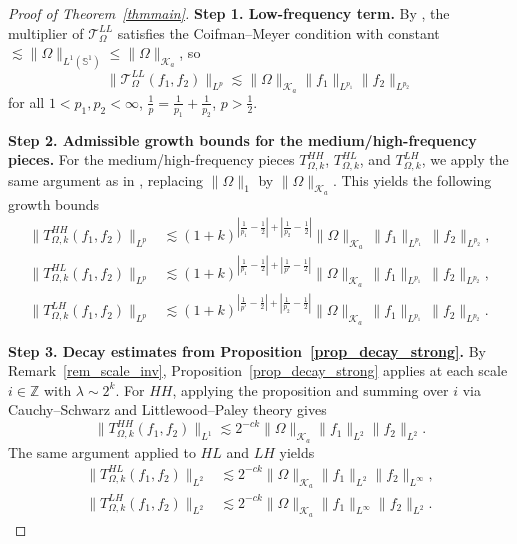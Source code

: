 \documentclass[11pt]{amsart}
\begin{document}
\begin{proof}[Proof of Theorem~\ref{thmmain}]
	
	\medskip
	\noindent
	
\noindent\textbf{Step 1. Low-frequency term.}
	By \cite[Lemma~5.1 and Theorem~5.2]{bhojak2025alternate}, the multiplier 
	of $\mathcal{T}_\Omega^{LL}$ satisfies the Coifman--Meyer condition with 
	constant $\lesssim\|\Omega\|_{L^1(\mathbb S^1)}\le\|\Omega\|_{\mathcal K_a}$, 
	so
	\[
	\|\mathcal{T}_\Omega^{LL}(f_1,f_2)\|_{L^p}
	\lesssim
	\|\Omega\|_{\mathcal K_a}\|f_1\|_{L^{p_1}}\|f_2\|_{L^{p_2}}
	\]
	for all $1<p_1,p_2<\infty$, $\frac1p=\frac1{p_1}+\frac1{p_2}$, $p>\frac12$.
	
	\medskip
	\noindent
	\textbf{Step 2. Admissible growth bounds for the medium/high-frequency pieces.}  
	For the medium/high-frequency pieces \(T_{\Omega,k}^{HH}\), \(T_{\Omega,k}^{HL}\), and \(T_{\Omega,k}^{LH}\), we apply the same argument as in \cite[Lemma~5.3]{bhojak2025alternate}, replacing \(\|\Omega\|_1\) by \(\|\Omega\|_{\mathcal K_a}\). This yields the following growth bounds
	\begin{align}
		\|T_{\Omega,k}^{HH}(f_1,f_2)\|_{L^p}
		&\lesssim
		(1+k)^{\left|\frac1{p_1}-\frac12\right|+\left|\frac1{p_2}-\frac12\right|}
		\|\Omega\|_{\mathcal K_a}\,
		\|f_1\|_{L^{p_1}}\,
		\|f_2\|_{L^{p_2}},\label{eqHH-growth}\\
		\|T_{\Omega,k}^{HL}(f_1,f_2)\|_{L^p}
		&\lesssim
		(1+k)^{\left|\frac1{p_1}-\frac12\right|+\left|\frac1{p'}-\frac12\right|}
		\|\Omega\|_{\mathcal K_a}\,
		\|f_1\|_{L^{p_1}}\,
		\|f_2\|_{L^{p_2}},\label{eqHL-growth}\\
		\|T_{\Omega,k}^{LH}(f_1,f_2)\|_{L^p}
		&\lesssim
		(1+k)^{\left|\frac1{p'}-\frac12\right|+\left|\frac1{p_2}-\frac12\right|}
		\|\Omega\|_{\mathcal K_a}\,
		\|f_1\|_{L^{p_1}}\,
		\|f_2\|_{L^{p_2}}.\label{eqLH-growth}
	\end{align}
	
	\medskip
	\noindent
	\textbf{Step 3. Decay estimates from Proposition~\ref{prop_decay_strong}.}
	By Remark~\ref{rem_scale_inv}, Proposition~\ref{prop_decay_strong} applies 
	at each scale $i\in\mathbb Z$ with $\lambda\sim 2^k$. For $HH$, applying 
	the proposition and summing over $i$ via Cauchy--Schwarz and 
	Littlewood--Paley theory gives
	\begin{equation}\label{eqHH-decay-221}
		\|T_{\Omega,k}^{HH}(f_1,f_2)\|_{L^1}
		\lesssim 2^{-ck}\|\Omega\|_{\mathcal K_a}\|f_1\|_{L^2}\|f_2\|_{L^2}.
	\end{equation}
	The same argument applied to $HL$ and $LH$ yields
	\begin{align}
		\|T_{\Omega,k}^{HL}(f_1,f_2)\|_{L^2}
		&\lesssim 2^{-ck}\|\Omega\|_{\mathcal K_a}
		\|f_1\|_{L^2}\|f_2\|_{L^\infty},\label{eqHL-decay-2inf2}\\
		\|T_{\Omega,k}^{LH}(f_1,f_2)\|_{L^2}
		&\lesssim 2^{-ck}\|\Omega\|_{\mathcal K_a}
		\|f_1\|_{L^\infty}\|f_2\|_{L^2}.\label{eqLH-decay-inf22}
	\end{align}
	

\end{proof}
\end{document}
